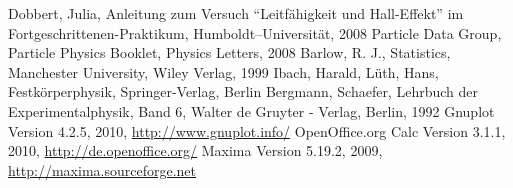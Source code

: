 \renewcommand{\refname}{Literatur und Programme}
\begin{thebibliography}{xxxxxx}
Dobbert, Julia, Anleitung zum Versuch ``Leitfähigkeit und Hall-Effekt'' im Fortgeschrittenen-Praktikum, Humboldt–Universität, 2008
Particle Data Group, Particle Physics Booklet, Physics Letters, 2008
Barlow, R. J., Statistics, Manchester University, Wiley Verlag, 1999
Ibach, Harald, Lüth, Hans, Festkörperphysik, Springer-Verlag, Berlin
Bergmann, Schaefer, Lehrbuch der Experimentalphysik, Band 6, Walter de Gruyter - Verlag, Berlin, 1992
Gnuplot Version 4.2.5, 2010,
\href{http://www.gnuplot.info/}{http://www.gnuplot.info/}
OpenOffice.org Calc Version 3.1.1, 2010,
\href{http://de.openoffice.org/}{http://de.openoffice.org/}
Maxima Version 5.19.2, 2009, \href{http://maxima.sourceforge.net}{http://maxima.sourceforge.net}
\end{thebibliography}